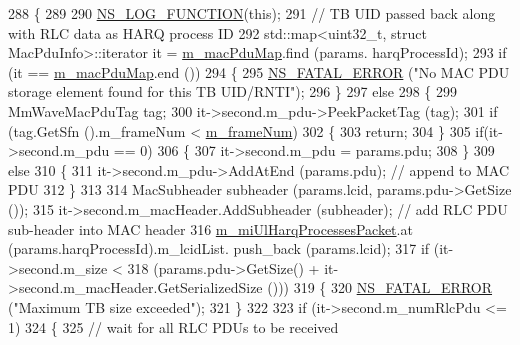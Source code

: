 \begin{DoxyCode}
288 \{
289 
290         \hyperlink{log-macros-disabled_8h_a90b90d5bad1f39cb1b64923ea94c0761}{NS\_LOG\_FUNCTION}(\textcolor{keyword}{this});
291         \textcolor{comment}{// TB UID passed back along with RLC data as HARQ process ID}
292         std::map<uint32\_t, struct MacPduInfo>::iterator it = \hyperlink{classns3_1_1MmWaveUeMac_a09a4dbc07dea88a700daf9ae82588768}{m\_macPduMap}.find (params.
      harqProcessId);
293         \textcolor{keywordflow}{if} (it == \hyperlink{classns3_1_1MmWaveUeMac_a09a4dbc07dea88a700daf9ae82588768}{m\_macPduMap}.end ())
294         \{
295                 \hyperlink{group__fatal_ga5131d5e3f75d7d4cbfd706ac456fdc85}{NS\_FATAL\_ERROR} (\textcolor{stringliteral}{"No MAC PDU storage element found for this TB UID/RNTI"});
296         \}
297         \textcolor{keywordflow}{else}
298         \{
299                 MmWaveMacPduTag tag;
300                 it->second.m\_pdu->PeekPacketTag (tag);
301                 \textcolor{keywordflow}{if} (tag.GetSfn ().m\_frameNum < \hyperlink{classns3_1_1MmWaveUeMac_aff3b4a35e6f83bd3762e0d1187475717}{m\_frameNum})
302                 \{
303                         \textcolor{keywordflow}{return};
304                 \}
305                 \textcolor{keywordflow}{if}(it->second.m\_pdu == 0)
306                 \{
307                         it->second.m\_pdu = params.pdu;
308                 \}
309                 \textcolor{keywordflow}{else}
310                 \{
311                         it->second.m\_pdu->AddAtEnd (params.pdu); \textcolor{comment}{// append to MAC PDU   }
312                 \}
313 
314                 MacSubheader subheader (params.lcid, params.pdu->GetSize ());
315                 it->second.m\_macHeader.AddSubheader (subheader); \textcolor{comment}{// add RLC PDU sub-header into MAC header}
316                 \hyperlink{classns3_1_1MmWaveUeMac_a53afd2059b620c2f3dd1d9791c4df83c}{m\_miUlHarqProcessesPacket}.at (params.harqProcessId).m\_lcidList.
      push\_back (params.lcid);
317                 \textcolor{keywordflow}{if} (it->second.m\_size <
318                                 (params.pdu->GetSize() + it->second.m\_macHeader.GetSerializedSize ()))
319                 \{
320                         \hyperlink{group__fatal_ga5131d5e3f75d7d4cbfd706ac456fdc85}{NS\_FATAL\_ERROR} (\textcolor{stringliteral}{"Maximum TB size exceeded"});
321                 \}
322 
323                 \textcolor{keywordflow}{if} (it->second.m\_numRlcPdu <= 1)
324                 \{
325                         \textcolor{comment}{// wait for all RLC PDUs to be received}

\end{DoxyCode}
